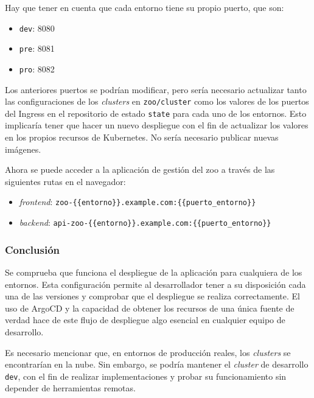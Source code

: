 \begin{enumerate}
    Hay que tener en cuenta que cada entorno tiene su propio puerto, que son:
    \begin{itemize}
      \item \texttt{dev}: 8080
      \item \texttt{pre}: 8081
      \item \texttt{pro}: 8082
    \end{itemize}

    Los anteriores puertos se podrían modificar, pero sería necesario actualizar tanto las configuraciones de los \textit{clusters} en \texttt{zoo/cluster} como los valores de los puertos del Ingress en el repositorio de estado \texttt{state} para cada uno de los entornos. Esto implicaría tener que hacer un nuevo despliegue con el fin de actualizar los valores en los propios recursos de Kubernetes. No sería necesario publicar nuevas imágenes.

    Ahora se puede acceder a la aplicación de gestión del zoo a través de las siguientes rutas en el navegador:

    \begin{itemize}
      \item \textit{frontend}: \texttt{zoo-\{\{entorno\}\}.example.com:\{\{puerto\_entorno\}\}}
      \item \textit{backend}: \texttt{api-zoo-\{\{entorno\}\}.example.com:\{\{puerto\_entorno\}\}}
    \end{itemize}

\end{enumerate}

\subsubsection*{Conclusión}

Se comprueba que funciona el despliegue de la aplicación para cualquiera de los entornos. Esta configuración permite al desarrollador tener a su disposición cada una de las versiones y comprobar que el despliegue se realiza correctamente. El uso de ArgoCD y la capacidad de obtener los recursos de una única fuente de verdad hace de este flujo de despliegue algo esencial en cualquier equipo de desarrollo.

Es necesario mencionar que, en entornos de producción reales, los \textit{clusters} se encontrarían en la nube. Sin embargo, se podría mantener el \textit{cluster} de desarrollo \texttt{dev}, con el fin de realizar implementaciones y probar su funcionamiento sin depender de herramientas remotas.

